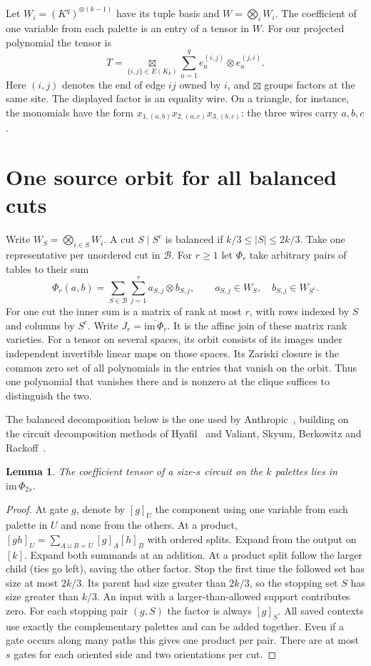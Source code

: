 \documentclass[11pt,letterpaper]{article}
\newtheorem{lemma}[theorem]{Lemma}
\newcommand{\bal}{\mathcal B}
\begin{document}
Let $W_i=(K^q)^{\otimes(k-1)}$ have its tuple basis and
$W=\bigotimes_i W_i$. The coefficient of one variable from each palette
is an entry of a tensor in $W$. For our projected polynomial the tensor is
\[
               T=\mathop{\boxtimes}\limits_{\{i,j\}\in E(K_k)}
                        \sum_{a=1}^q e_a^{(i,j)}\otimes e_a^{(j,i)} .
\]
Here $(i,j)$ denotes the end of edge $ij$ owned by $i$, and $\boxtimes$
groups factors at the same site. The displayed factor is an equality
wire. On a triangle, for instance, the monomials have the form
$x_{1,(a,b)}x_{2,(a,c)}x_{3,(b,c)}$: the three wires carry $a,b,c$.

\section{One source orbit for all balanced cuts}
Write $W_S=\bigotimes_{i\in S}W_i$. A cut $S\mid S^c$ is balanced if
$k/3\le |S|\le2k/3$. Take one representative per unordered cut in
$\bal$. For $r\ge1$ let $\Phi_r$ take arbitrary pairs of tables to their sum
\[
    \Phi_r(a,b)=\sum_{S\in\bal}\sum_{j=1}^r a_{S,j}\otimes b_{S,j},
       \qquad a_{S,j}\in W_S,\quad b_{S,j}\in W_{S^c}.
       \tag{1}\label{join}
\]
For one cut the inner sum is a matrix of rank at most $r$, with rows
indexed by $S$ and columns by $S^c$. Write $J_r=\overline{\mathrm{im}\,\Phi_r}$.
It is the affine join of these matrix rank varieties.
For a tensor on several spaces, its orbit consists of its images under
independent invertible linear maps on those spaces. Its Zariski closure
is the common zero set of all polynomials in the entries that vanish on
the orbit. Thus one polynomial that vanishes there and is nonzero at the
clique suffices to distinguish the two.

The balanced decomposition below is the one used by Anthropic~\cite[Lemma~E.4]{anthropic}, building on the circuit decomposition methods of Hyafil~\cite{hyafil} and Valiant, Skyum, Berkowitz and Rackoff~\cite{vsbr}.

\begin{lemma}\label{cut}
The coefficient tensor of a size-$s$ circuit on the $k$ palettes lies
in $\mathrm{im}\,\Phi_{2s}$.
\end{lemma}
\begin{proof}
At gate $g$, denote by $[g]_U$ the component using one variable from
each palette in $U$ and none from the others. At a product,
$[gh]_U=\sum_{A\sqcup B=U}[g]_A[h]_B$ with ordered splits. Expand from
the output on $[k]$. Expand both summands at an addition. At a product
split follow the larger child (ties go left), saving the other factor.
Stop the first time the followed set has size at most $2k/3$. Its parent
had size greater than $2k/3$, so the stopping set $S$ has size greater
than $k/3$. An input with a larger-than-allowed support contributes zero.
For each stopping pair $(g,S)$ the factor is always $[g]_S$.
All saved contexts use exactly the complementary palettes and can be
added together. Even if a gate occurs along many paths this gives one
product per pair. There are at most $s$ gates for each oriented side and
two orientations per cut.
\end{proof}
\end{document}
